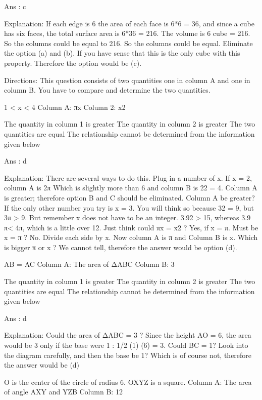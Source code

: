     Ans : c

    Explanation:
    If each edge is 6 the area of each face is 6*6 = 36, and since a cube has six faces, the total surface area is 6*36 = 216. The volume is 6 cube = 216. So the columns could be equal to 216. So the columns could be equal. Eliminate the option (a) and (b). If you have sense that this is the only cube with this property. Therefore the option would be (c). 



Directions:
This question consists of two quantities one in column A and one in column B. You have to compare and determine the two quantities.

    1 < x < 4
    Column A: πx
    Column 2: x2

        The quantity in column 1 is greater
        The quantity in column 2 is greater
        The two quantities are equal
        The relationship cannot be determined from the information given below 

    Ans : d

    Explanation:
    There are several ways to do this. Plug in a number of x. If x = 2, column A is 2π
    Which is slightly more than 6 and column B is 22 = 4. Column A is greater; therefore option B and C should be eliminated. Column A be greater? If the only other number you try is x = 3. You will think so because 32 = 9, but 3π > 9. But remember x does not have to be an integer. 3.92 > 15, whereas 3.9 π< 4π, which is a little over 12. Just think could πx = x2 ? Yes, if x = π. Must be x = π ? No. Divide each side by x. Now column A is π and Column B is x. Which is bigger π or x ? We cannot tell, therefore the answer would be option (d).



    AB = AC
    Column A: The area of ΔABC
    Column B: 3

        The quantity in column 1 is greater
        The quantity in column 2 is greater
        The two quantities are equal
        The relationship cannot be determined from the information given below 

    Ans : d

    Explanation:
    Could the area of ΔABC = 3 ? Since the height AO = 6, the area would be 3 only if the base were 1 : 1/2 (1) (6) = 3. Could BC = 1? Look into the diagram carefully, and then the base be 1? Which is of course not, therefore the answer would be (d)



    O is the center of the circle of radius 6. OXYZ is a square.
    Column A: The area of angle AXY and YZB
    Column B: 12

